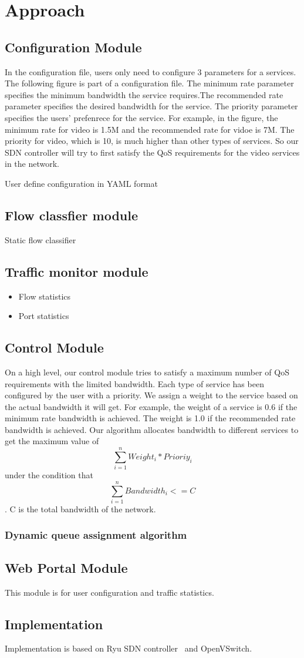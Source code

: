 \section{Approach}
\label{sect:approach}
\subsection{Configuration Module}
In the configuration file, users only need to configure 3 parameters for a services. The following figure is part of a configuration file.
The minimum rate parameter specifies the minimum bandwidth the service requires.The recommended rate parameter specifies the desired bandwidth for the service.
The priority parameter specifies the users' prefenrece for the service.
For example, in the figure, the minimum rate for video is 1.5M and the recommended rate for vidoe is 7M. The priority for video, which is 10, is much higher than other types of services. So our SDN controller will try to first satisfy the QoS requirements for the video services in the network.

User define configuration in YAML format
\subsection{Flow classfier module}
Static flow classifier
\subsection{Traffic monitor module}
\begin{itemize}
\item Flow statistics
\item Port statistics
\end{itemize}
\subsection{Control Module}
On a high level, our control module tries to satisfy a maximum number of QoS requirements with the limited bandwidth.
Each type of service has been configured by the user with a priority. We assign a weight to the service based on the actual bandwidth it will get. For example, the weight of a service is 0.6 if the minimum rate bandwidth is achieved. The weight is 1.0 if the recommended rate bandwidth is achieved.
Our algorithm allocates bandwidth to different services to get the maximum value of $$\sum_{i=1}^{n} Weight_i*Prioriy_i $$ under the condition that
$$\sum_{i=1}^{n} Bandwidth_i <= C $$. C is the total bandwidth of the network.


\subsubsection{Dynamic queue assignment algorithm}
\subsection{Web Portal Module}
This module is for user configuration and traffic statistics.
\subsection{Implementation}
Implementation is based on Ryu SDN controller~\cite{ryu} and OpenVSwitch.
